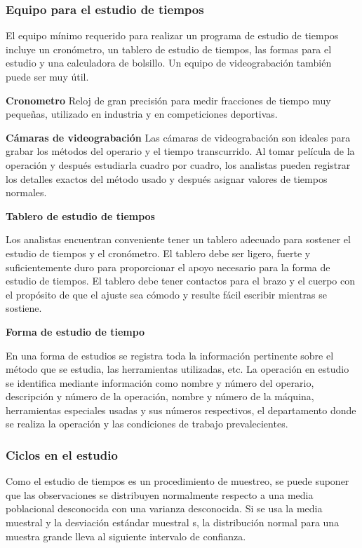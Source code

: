 \subsubsection{Equipo para el estudio de tiempos}

El equipo mínimo requerido para realizar un programa de estudio de tiempos incluye un cronómetro, un tablero de estudio de tiempos, las formas para el estudio y una calculadora de bolsillo. Un equipo de videograbación también puede ser muy útil.

\textbf{Cronometro}
Reloj de gran precisión para medir fracciones de tiempo muy pequeñas, utilizado en industria y en competiciones deportivas.
\cite{RAE}

\textbf{Cámaras de videograbación}
Las cámaras de videograbación son ideales para grabar los métodos del operario y el tiempo transcurrido. Al tomar película de la operación y después estudiarla cuadro por cuadro, los analistas pueden registrar los detalles exactos del método usado y después asignar valores de tiempos normales. 

\textbf{Tablero de estudio de tiempos}

Los analistas encuentran conveniente tener un tablero adecuado para sostener el estudio de tiempos y el cronómetro. El tablero debe ser ligero, fuerte y suficientemente duro para proporcionar el apoyo necesario para la forma de estudio de tiempos. El tablero debe tener contactos para el brazo y el cuerpo con el propósito de que el ajuste sea cómodo y resulte fácil escribir mientras se sostiene.

\textbf{Forma de estudio de tiempo}

En una forma de estudios se registra toda la información pertinente sobre el método que se estudia, las herramientas utilizadas, etc. La operación en estudio se identifica mediante información como nombre y número del operario, descripción y número de la operación, nombre y número de la máquina, herramientas especiales usadas y sus números respectivos, el departamento donde se realiza la operación y las condiciones de trabajo prevalecientes. 
\cite{niebel1980ingenieria}

\subsubsection{Ciclos en el estudio}
 Como el estudio de tiempos es un procedimiento de muestreo, se puede suponer que las observaciones se distribuyen normalmente respecto a una media poblacional desconocida con una varianza desconocida. Si se usa la media muestral y la desviación estándar muestral s, la distribución normal para una muestra grande lleva al siguiente intervalo de confianza.

